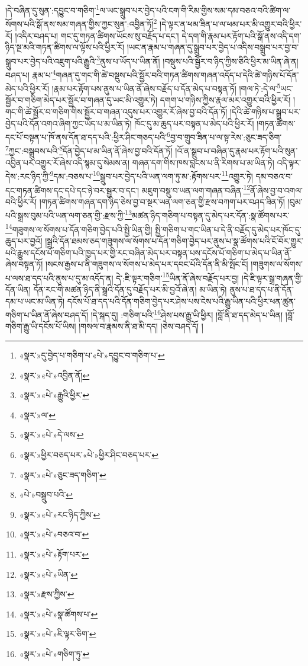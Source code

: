 །དེ་བཞིན་དུ་སུན་:དབྱུང་བ་གཅིག་\footnote{«སྣར་»དུ་བྱེད་པ་གཅིག་པ་«པེ་»དབྱུང་བ་གཅིག་པ་}ལ་ཡང་སྒྲུབ་པར་བྱེད་པའི་ངག་གི་རིམ་གྱིས་སམ་དམ་བཅའ་བའི་ཚིག་ལ་སོགས་པའི་སྒོ་ནས་སམ་གཞན་གྱིས་ཀྱང་སུན་:འབྱིན་ཏོ།\footnote{«སྣར་»«པེ་»འབྱིན་ནོ།} །དེ་ལྟར་ན་ཕམ་ཟིན་པ་ལ་ཕམ་པར་མི་འགྱུར་བའི་ཕྱིར་རོ། །འདིར་བཤད་པ། གང་དུ་གཏན་ཚིགས་ཡོངས་སུ་བརྗོད་པ་དང་། དེ་དག་གི་རྣམ་པར་རྟོག་པའི་སྒོ་ནས་འདི་དག་ཉིད་སྔ་མའི་གཏན་ཚིགས་ལ་ལྟོས་པའི་ཕྱིར་རོ། །ཡང་ན་རྣམ་པ་གཞན་དུ་སྒྲུབ་པར་བྱེད་པ་འདིས་བསྒྲུབ་པར་བྱ་བ་སྒྲུབ་པར་བྱེད་པའི་འཇུག་པའི་རྒྱུའི་\footnote{«སྣར་»«པེ་»རྒྱུའི་ཕྱིར་}ནུས་པ་ཡོད་པ་ཡིན་ནོ། །བསྡུས་པའི་སྦྱོར་བ་ཉིད་ཀྱིས་ཅིའི་ཕྱིར་མ་ཡིན་ཞེ་ན། བཤད་པ། རྣམ་པ་\footnote{«སྣར་»ལ་}གཞན་དུ་གང་གི་ཚེ་བསྡུས་པའི་སྦྱོར་བའི་གཏན་ཚིགས་གཞན་འདོད་པ་དེའི་ཚེ་གཉིས་པོ་དོན་མེད་པའི་ཕྱིར་རོ། །རྣམ་པར་རྟོག་པས་ནུས་པ་ཡིན་ནོ་ཞེས་བརྗོད་པ་དོན་མེད་པ་བསྟན་ཏོ། །གལ་ཏེ་:དེ་ལ་\footnote{«སྣར་»«པེ་»དེ་ལས་}ཡང་སྦྱོར་བ་གཅིག་མེད་པར་སྦྱོར་བ་གཞན་དུ་ཡང་མི་འགྱུར་ཏེ། དགག་པ་གཉིས་ཀྱིས་རྣལ་མར་འགྱུར་བའི་ཕྱིར་རོ། །གང་གི་ཚེ་སྦྱོར་བ་གཅིག་གིས་སྦྱོར་བ་གཞན་འདུས་པར་འགྱུར་རོ་ཞེས་བྱ་བའི་དོན་ཏོ། །དེའི་ཚེ་གཉིས་པ་སྒྲུབ་པར་བྱེད་པའི་དོན་འགའ་ཞིག་ཀྱང་ཡོད་པ་མ་ཡིན་ཏེ། ཁོང་དུ་མ་ཆུད་པར་བསྟན་པ་མེད་པའི་ཕྱིར་རོ། །གཏན་ཚིགས་དང་པོ་བསྟན་པ་ཁོ་ནས་དོན་ཐ་དད་པའི་:ཕྱིར་ཤིང་གཅད་པའི་\footnote{«སྣར་»ཕྱིར་བཅད་པར་«པེ་»ཕྱིར་ཤིང་བཅད་པར་}བྱ་བ་གྲུབ་ཟིན་པ་ལ་སྟ་རེས་:ཅུང་ཟད་ཅིག་\footnote{«སྣར་»«པེ་»ཅུང་ཟད་གཅིག་}ཀྱང་:བསྒྲུབས་པའི་\footnote{«པེ་»བསྒྲུབ་པའི་}དོན་བྱེད་པ་མ་ཡིན་ནོ་ཞེས་བྱ་བའི་དོན་ཏོ། །འོ་ན་སྒྲུབ་པ་བཞིན་དུ་རྣམ་པར་རྟོག་པའི་སུན་འབྱིན་པར་འགྱུར་རོ་ཞེས་འདི་སྙམ་དུ་སེམས་ན། གཞན་དག་གིས་ཁས་བླངས་པ་ནི་རིགས་པ་མ་ཡིན་ཏེ། འདི་ལྟར་དེས་:རང་ཉིད་ཀྱི་\footnote{«སྣར་»«པེ་»རང་ཉིད་ཀྱིས་}དམ་:བཅས་པ་\footnote{«སྣར་»«པེ་»བཅའ་བ་}སྒྲུབ་པར་བྱེད་པའི་ཡན་ལག་ཏུ་མ་:རྟོགས་པར་\footnote{«སྣར་»«པེ་»རྟོག་པར་}འགྱུར་ཏེ། དམ་བཅའ་བ་དང་གཏན་ཚིགས་དང་དཔེ་དང་ཉེ་བར་སྦྱར་བ་དང་། མཇུག་བསྡུ་བ་ཡན་ལག་གཞན་བཞིན་\footnote{«སྣར་»«པེ་»ཡིན་}ནོ་ཞེས་བྱ་བ་འགལ་བའི་ཕྱིར་རོ། །གཏན་ཚིགས་གཞན་དག་ཉིད་ཅེས་བྱ་བ་སྔར་ཡན་ལག་ཅན་གྱི་རྫས་བཀག་པར་བཤད་ཟིན་ཏོ། །བུམ་པའི་སྒྲས་བུམ་པའི་ཡན་ལག་ཅན་གྱི་:རྫས་ཀྱི་\footnote{«སྣར་»རྫས་ཀྱིས་}མཚན་ཉིད་གཅིག་པ་བསྟན་དུ་མེད་པར་དོན་:སྣ་ཚོགས་པར་\footnote{«སྣར་»«པེ་»སྣ་ཚོགས་པ་}གཟུགས་ལ་སོགས་པ་དོན་གཅིག་བྱེད་པའི་སྤྱི་ཡིན་གྱི། སྤྱི་གཅིག་པ་གང་ཡིན་པ་དེ་ནི་བརྗོད་དུ་མེད་པར་ཁོང་དུ་ཆུད་པར་བྱའོ། །སྒྲའི་དོན་ཐམས་ཅད་གཟུགས་ལ་སོགས་པ་དོན་གཅིག་བྱེད་པར་ནུས་པ་སྣ་ཚོགས་པའི་ངོ་བོར་གྱུར་པའི་རྒྱུས་དངོས་པོ་གཅིག་པའི་ཁྱད་པར་གྱི་རང་བཞིན་མེད་པར་བསྟན་པས་དངོས་པོ་གཅིག་པ་མེད་པ་ཡིན་ནོ་ཞེས་བསྟན་ཏོ། །སངས་རྒྱས་པ་ནི་གཟུགས་ལ་སོགས་པ་མེད་པར་དབང་པོའི་དོན་ནི་མི་སྤོང་ངོ། །གཟུགས་ལ་སོགས་པ་ལས་ཐ་དད་པའི་ནུས་པ་དུ་མ་འདོད་ན། དེ་:ཇི་ལྟར་གཅིག་\footnote{«སྣར་»«པེ་»ཇི་ལྟར་ཅིག་}ཡིན་ནོ་ཞེས་བརྗོད་པར་བྱ། །དེ་ཇི་ལྟར་སྒྲ་གཞན་གྱི་དོན་ཡིན། དོན་རང་གི་མཚན་ཉིད་ནི་སྒྲའི་དོན་དུ་བརྗོད་པར་མི་བྱའོ་ཞེ་ན། མ་ཡིན་ཏེ། ནུས་པ་ཐ་དད་པ་ནི་དོན་དམ་པ་ཡང་མ་ཡིན་ཏེ། དངོས་པོ་ཐ་དད་པའི་དོན་གཅིག་བྱེད་པར་ཤེས་པས་ངེས་པའི་རྒྱུ་ཡིན་པའི་ཕྱིར་ཕན་ཚུན་གཅིག་པ་ཡིན་ནོ་ཞེས་བཤད་དོ། །དེ་སྐད་དུ། :གཅིག་པའི་\footnote{«སྣར་»«པེ་»གཅིག་ཏུ་}ཤེས་པས་རྒྱུ་ཡི་ཕྱིར། །བློ་ནི་ཐ་དད་མེད་པ་ཡིན། །བློ་གཅིག་རྒྱུ་ཡི་དངོས་པོ་ཡིས། །གསལ་བ་རྣམས་ནི་ཐ་མི་དད། །ཅེས་བཤད་དོ། །
